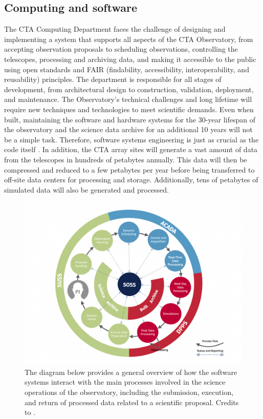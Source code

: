 \subsection{Computing and software}
The CTA Computing Department faces the challenge of designing and implementing a system that supports all aspects of the CTA Observatory, from accepting observation proposals to scheduling observations, controlling the telescopes, processing and archiving data, and making it accessible to the public using open standards and FAIR (findability, accessibility, interoperability, and reusability) principles. The department is responsible for all stages of development, from architectural design to construction, validation, deployment, and maintenance. The Observatory's technical challenges and long lifetime will require new techniques and technologies to meet scientific demands. Even when built, maintaining the software and hardware systems for the 30-year lifespan of the observatory and the science data archive for an additional 10 years will not be a simple task. Therefore, software systems engineering is just as crucial as the code itself \cite{Oya2017}. In addition, the CTA array sites will generate a vast amount of data from the telescopes in hundreds of petabytes annually. This data will then be compressed and reduced to a few petabytes per year before being transferred to off-site data centers for processing and storage. Additionally, tens of petabytes of simulated data will also be generated and processed.
\begin{figure}[ht]
\centering
\includegraphics[width=0.9\linewidth]{figures/introduction/cta-softwares.png}
\caption{The diagram below provides a general overview of how the software systems interact with the main processes involved in the science operations of the observatory, including the submission, execution, and return of processed data related to a scientific proposal. Credits to \cite{ctaobservatorywebsitetechnology}.}
\label{fig:cta-softwares}
\end{figure}
